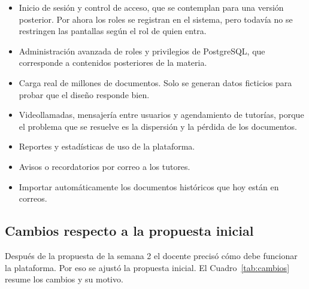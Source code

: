 \documentclass[12pt,a4paper,oneside]{article}
\begin{document}
\begin{itemize}[leftmargin=1.2cm]
  \item Inicio de sesión y control de acceso, que se contemplan para una versión posterior.
        Por ahora los roles se registran en el sistema, pero todavía no se restringen las
        pantallas según el rol de quien entra.
  \item Administración avanzada de roles y privilegios de PostgreSQL, que corresponde a
        contenidos posteriores de la materia.
  \item Carga real de millones de documentos. Solo se generan datos ficticios para
        probar que el diseño responde bien.
  \item Videollamadas, mensajería entre usuarios y agendamiento de tutorías, porque el
        problema que se resuelve es la dispersión y la pérdida de los documentos.
  \item Reportes y estadísticas de uso de la plataforma.
  \item Avisos o recordatorios por correo a los tutores.
  \item Importar automáticamente los documentos históricos que hoy están en correos.
\end{itemize}

\subsection{Cambios respecto a la propuesta inicial}

Después de la propuesta de la semana 2 el docente precisó cómo debe funcionar la
plataforma. Por eso se ajustó la propuesta inicial. El Cuadro~\ref{tab:cambios} resume
los cambios y su motivo.
\end{document}
